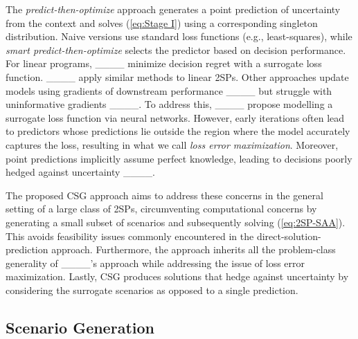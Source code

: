 The \textit{predict-then-optimize} approach generates a point prediction of uncertainty from the context and solves (\ref{eq:Stage I}) using a corresponding singleton distribution. Naive versions use standard loss functions (e.g., least-squares), while \textit{smart predict-then-optimize} selects the predictor based on decision performance. For linear programs, ____ minimize decision regret with a surrogate loss function. ____ apply similar methods to linear 2SPs. Other approaches update models using gradients of downstream performance ____ but struggle with uninformative gradients ____. To address this, ____ propose modelling a surrogate loss function via neural networks. However, early iterations often lead to predictors whose predictions lie outside the region where the model accurately captures the loss, resulting in what we call \textit{loss error maximization}. Moreover, point predictions implicitly assume perfect knowledge, leading to decisions poorly hedged against uncertainty ____.

The proposed CSG approach aims to address these concerns in the general setting of a large class of 2SPs, circumventing computational concerns by generating a small subset of scenarios and subsequently solving (\ref{eq:2SP-SAA}). This avoids feasibility issues commonly encountered in the direct-solution-prediction approach. Furthermore, the approach inherits all the problem-class generality of ____'s approach while addressing the issue of loss error maximization. Lastly, CSG produces solutions that hedge against uncertainty by considering the surrogate scenarios as opposed to a single prediction.


\subsection{Scenario Generation}

